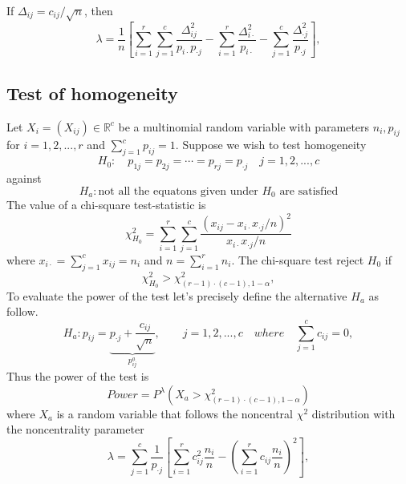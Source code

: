 \documentclass{article}
\begin{document}
If $\Delta_{ij} = c_{ij}/\sqrt{n}$, then 
\begin{equation}\label{independence_lambda}
    \lambda = \frac{1}{n}\left[\sum_{i=1}^{r}\sum_{j=1}^c \frac{\Delta_{ij}^2}{p_{i\cdot}p_{\cdot j}} - \sum_{i=1}^{r}\frac{\Delta_{i \cdot}^2}{p_{i \cdot}} - \sum_{j=1}^{c}\frac{\Delta_{\cdot j}^2}{p_{\cdot j}}\right],
\end{equation}



\subsection{Test of homogeneity}
Let $X_i=(X_{ij}) \in \mathbb{R}^{c}$ be a multinomial random variable with
parameters $n_{i},p_{ij}$ for $i=1,2,...,r$ and $\sum_{j=1}^cp_{ij}=1$. 
Suppose we wish to test homogeneity
\begin{equation}
    H_0: \quad p_{1j}=p_{2j}=\cdots = p_{rj} = p_{\cdot j}\quad j=1,2,...,c
\end{equation}
against
\begin{equation}
    H_a: \mbox{not all the equatons given under $H_0$ are satisfied}
\end{equation}
The value of a chi-square test-statistic is
\begin{equation}
    \chi^2_{H_0} = \sum_{i=1}^r\sum_{j=1}^c \frac{\left(x_{ij} - x_{i \cdot}x_{\cdot j}/n\right)^2}{x_{i \cdot}x_{\cdot j}/n}
\end{equation}
where $x_{i \cdot} = \sum_{j=1}^c x_{ij} = n_{i}$ and $n = \sum_{i=1}^r n_{i}$.
The chi-square test reject $H_0$ if
\begin{equation}
    \chi^2_{H_0} > \chi^2_{(r-1)\cdot(c-1),1-\alpha},
\end{equation}
To evaluate the power of the test let's precisely define the alternative $H_a$ as follow.
\begin{equation}
    H_a: p_{ij} = \underbrace{p_{\cdot j} + \frac{c_{ij}}{\sqrt{n}}}_{p^a_{ij}} , \qquad j=1,2,...,c \quad where \quad \sum_{j=1}^{c}c_{ij}=0, 
\end{equation}
Thus the power of the test is
\begin{equation}
    Power = P^{\lambda}\left(X_a > \chi^2_{(r-1)\cdot(c-1),1-\alpha}\right)
\end{equation}
where $X_a$ is a random variable that follows the noncentral $\chi^2$ distribution with the noncentrality parameter
\begin{equation}
    \lambda = \sum_{j=1}^{c}\frac{1}{p_{\cdot j}}\left[ \sum_{i=1}^{r} c_{ij}^2 \frac{n_i}{n} -  \left(\sum_{i=1}^{r} c_{ij} \frac{n_i}{n}\right)^2  \right],
\end{equation}
\end{document}
